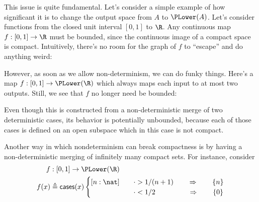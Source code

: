 This issue is quite fundamental. Let's consider a simple example of how significant it is to change the output space from $A$ to $\PLower(A)$. Let's consider functions from the closed unit interval $[0,1]$ to $\R$. Any continuous map $f : [0,1] \to \R$ must be bounded, since the continuous image of a compact space is compact. Intuitively, there's no room for the graph of $f$ to ``escape'' and do anything weird:

\begin{center}
\end{center}

However, as soon as we allow non-determinism, we can do funky things. Here's a map $f : [0,1] \to \PLower(\R)$ which always maps each input to at most two outputs. Still, we see that $f$ no longer need be bounded:
\begin{center}
\end{center}

Even though this is constructed from a non-deterministic merge of two deterministic cases, its behavior is potentially unbounded, because each of those cases is defined on an open subspace which in this case is not compact.

Another way in which nondeterminism can break compactness is by having a non-deterministic merging of infinitely many compact sets. For instance, consider
\begin{align*}
f &: [0,1] \to \PLower(\R)
\\ f(x) &\triangleq \mathsf{cases}(x)
\begin{cases}
[n : \nat] \quad &\cdot > 1 / (n + 1)
 \qquad \Rightarrow \qquad
 \{ n \}
\\ \quad &\cdot < 1/2
\qquad \qquad \ \  \Rightarrow \qquad
\{ 0 \}
\end{cases}
\end{align*}

